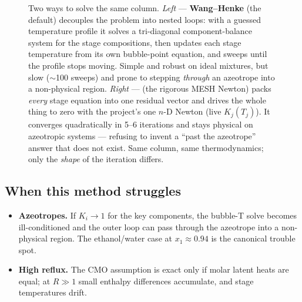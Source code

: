 \documentclass[11pt,a4paper]{article}
\newcommand{\Jac}{\mathbf{J}}
\begin{document}
\begin{figure}[h]
\caption{Two ways to solve the same column.  \emph{Left} ---
\textbf{Wang--Henke} (the default) decouples the problem into nested
loops: with a guessed temperature profile it solves a tri-diagonal
component-balance system for the stage compositions, then updates each
stage temperature from its own bubble-point equation, and sweeps until
the profile stops moving.  Simple and robust on ideal mixtures, but slow
($\sim$100 sweeps) and prone to stepping \emph{through} an azeotrope
into a non-physical region.  \emph{Right} ---
 (the rigorous MESH Newton) packs
\emph{every} stage equation into one residual vector and drives the
whole thing to zero with the project's one $n$-D Newton (live
$K_j(T_j)$).  It converges quadratically in 5--6 iterations and stays
physical on azeotropic systems --- refusing to invent a ``past the
azeotrope'' answer that does not exist.  Same column, same
thermodynamics; only the \emph{shape} of the iteration differs.}
\label{fig:distillation-methods}
\end{figure}

\subsection{When this method struggles}

\begin{itemize}[leftmargin=*,nosep,topsep=2pt]
  \item \textbf{Azeotropes.} If $K_i \to 1$ for the key components,
        the bubble-T solve becomes ill-conditioned and the outer loop
        can pass through the azeotrope into a non-physical region.
        The ethanol/water case at $x_1 \approx 0.94$ is the canonical
        trouble spot.
  \item \textbf{High reflux.} The CMO assumption is exact only if molar
        latent heats are equal; at $R \gg 1$ small enthalpy
        differences accumulate, and stage temperatures drift.
\end{itemize}
\end{document}
